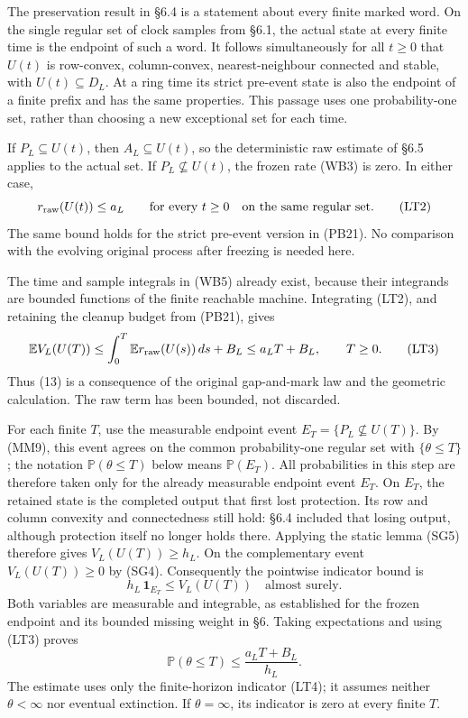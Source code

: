 \documentclass[
  11pt,
  a4paper,
]{article}
\begin{document}
The preservation result in §6.4 is a statement about every finite marked
word. On the single regular set of clock samples from §6.1, the actual
state at every finite time is the endpoint of such a word. It follows
simultaneously for all \(t\geq0\) that \(U(t)\) is row-convex,
column-convex, nearest-neighbour connected and stable, with
\(U(t)\subseteq D_L\). At a ring time its strict pre-event state is also
the endpoint of a finite prefix and has the same properties. This
passage uses one probability-one set, rather than choosing a new
exceptional set for each time.

If \(P_L\subseteq U(t)\), then \(A_L\subseteq U(t)\), so the
deterministic raw estimate of §6.5 applies to the actual set. If
\(P_L\not\subseteq U(t)\), the frozen rate (WB3) is zero. In either
case, \[
r_{\rm raw}(U(t))\leq a_L
\qquad\text{for every }t\geq0
\quad\text{on the same regular set}.
\tag{LT2}
\] The same bound holds for the strict pre-event version in (PB21). No
comparison with the evolving original process after freezing is needed
here.

The time and sample integrals in (WB5) already exist, because their
integrands are bounded functions of the finite reachable machine.
Integrating (LT2), and retaining the cleanup budget from (PB21), gives
\[
\mathbb E V_L(U(T))
\leq\int_0^T\mathbb E r_{\rm raw}(U(s))\,ds+B_L
\leq a_LT+B_L,\qquad T\geq0.
\tag{LT3}
\] Thus (13) is a consequence of the original gap-and-mark law and the
geometric calculation. The raw term has been bounded, not discarded.

For each finite \(T\), use the measurable endpoint event
\(E_T=\{P_L\not\subseteq U(T)\}\). By (MM9), this event agrees on the
common probability-one regular set with \(\{\theta\leq T\}\); the
notation \(\mathbb P(\theta\leq T)\) below means \(\mathbb P(E_T)\). All
probabilities in this step are therefore taken only for the already
measurable endpoint event \(E_T\). On \(E_T\), the retained state is the
completed output that first lost protection. Its row and column
convexity and connectedness still hold: §6.4 included that losing
output, although protection itself no longer holds there. Applying the
static lemma (SG5) therefore gives \(V_L(U(T))\geq h_L\). On the
complementary event \(V_L(U(T))\geq0\) by (SG4). Consequently the
pointwise indicator bound is \[
h_L\,\mathbf1_{E_T}\leq V_L(U(T))
\quad\text{almost surely}.
\tag{LT4}
\] Both variables are measurable and integrable, as established for the
frozen endpoint and its bounded missing weight in §6. Taking
expectations and using (LT3) proves \[
\mathbb P(\theta\leq T)\leq\frac{a_LT+B_L}{h_L}.
\tag{LT5}
\] The estimate uses only the finite-horizon indicator (LT4); it assumes
neither \(\theta<\infty\) nor eventual extinction. If \(\theta=\infty\),
its indicator is zero at every finite \(T\).
\end{document}
